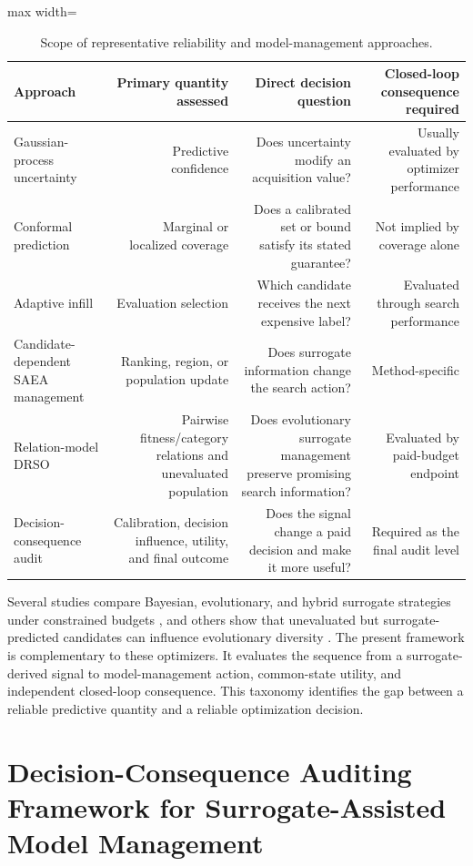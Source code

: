\documentclass[cmc,article,submit,moreauthors,pdftex]{Definitions/tsp}
\begin{document}
\begin{table}[H]
\tablesize{\scriptsize}
\caption{Scope of representative reliability and model-management approaches.}
\label{tab:main-1}
\centering
\begin{adjustbox}{max width=\textwidth}
\begin{tabular}{lrrr}
\toprule
\textbf{Approach} & \textbf{Primary quantity assessed} & \textbf{Direct decision question} & \textbf{Closed-loop consequence required} \\
\midrule
Gaussian-process uncertainty & Predictive confidence & Does uncertainty modify an acquisition value? & Usually evaluated by optimizer performance \\
Conformal prediction & Marginal or localized coverage & Does a calibrated set or bound satisfy its stated guarantee? & Not implied by coverage alone \\
Adaptive infill & Evaluation selection & Which candidate receives the next expensive label? & Evaluated through search performance \\
Candidate-dependent SAEA management & Ranking, region, or population update & Does surrogate information change the search action? & Method-specific \\
Relation-model DRSO & Pairwise fitness/category relations and unevaluated population & Does evolutionary surrogate management preserve promising search information? & Evaluated by paid-budget endpoint \\
Decision-consequence audit & Calibration, decision influence, utility, and final outcome & Does the signal change a paid decision and make it more useful? & Required as the final audit level \\
\bottomrule
\end{tabular}
\end{adjustbox}
\end{table}

Several studies compare Bayesian, evolutionary, and hybrid surrogate strategies under constrained budgets \cite{ref-21}, and others show that unevaluated but surrogate-predicted candidates can influence evolutionary diversity \cite{ref-22}. The present framework is complementary to these optimizers. It evaluates the sequence from a surrogate-derived signal to model-management action, common-state utility, and independent closed-loop consequence. This taxonomy identifies the gap between a reliable predictive quantity and a reliable optimization decision.

\hypertarget{decision-consequence-auditing-framework-for-surrogate-assisted-model-management}{%
\section{Decision-Consequence Auditing Framework for Surrogate-Assisted Model Management}\label{decision-consequence-auditing-framework-for-surrogate-assisted-model-management}}
\end{document}
